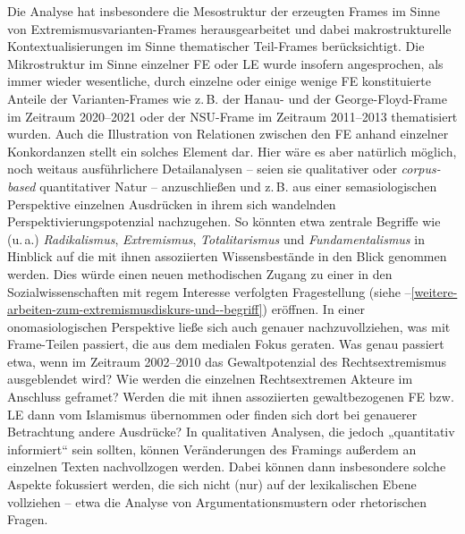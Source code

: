 Die Analyse hat insbesondere die Mesostruktur der erzeugten Frames im Sinne von Extremismusvarianten-Frames herausgearbeitet und dabei makrostrukturelle Kontextualisierungen im Sinne thematischer Teil-Frames berücksichtigt. Die Mikrostruktur im Sinne einzelner FE oder LE wurde insofern angesprochen, als immer wieder wesentliche, durch einzelne oder einige wenige FE konstituierte Anteile der Varianten-Frames wie z.\,B. der Hanau- und der George-Floyd-Frame im Zeitraum 2020--2021 oder der NSU-Frame im Zeitraum 2011--2013 thematisiert wurden. Auch die Illustration von Relationen zwischen den FE anhand einzelner Konkordanzen stellt ein solches Element dar. Hier wäre es aber natürlich möglich, noch weitaus ausführlichere Detailanalysen -- seien sie qualitativer oder \emph{corpus-based} quantitativer Natur -- anzuschließen und z.\,B. aus einer semasiologischen Perspektive einzelnen Ausdrücken in ihrem sich wandelnden Perspektivierungspotenzial nachzugehen. So könnten etwa zentrale Begriffe wie (u.\,a.) \emph{Radikalismus}, \emph{Extremismus}, \emph{Totalitarismus} und \emph{Fundamentalismus} in Hinblick auf die mit ihnen assoziierten Wissensbestände in den Blick genommen werden. Dies würde einen neuen methodischen Zugang zu einer in den Sozialwissenschaften mit regem Interesse verfolgten Fragestellung (siehe –\ref{weitere-arbeiten-zum-extremismusdiskurs-und--begriff}) eröffnen. In einer onomasiologischen Perspektive ließe sich auch genauer nachzuvollziehen, was mit Frame-Teilen passiert, die aus dem medialen Fokus geraten. Was genau passiert etwa, wenn im Zeitraum 2002--2010 das Gewaltpotenzial des Rechtsextremismus ausgeblendet wird? Wie werden die einzelnen Rechtsextremen Akteure im Anschluss geframet? Werden die mit ihnen assoziierten gewaltbezogenen FE bzw. LE dann vom Islamismus übernommen oder finden sich dort bei genauerer Betrachtung andere Ausdrücke? In qualitativen Analysen, die jedoch „quantitativ informiert`` \autocite{bubenhoferQuantitativInformierteQualitative2013} sein sollten, können Veränderungen des Framings außerdem an einzelnen Texten nachvollzogen werden. Dabei können dann insbesondere solche Aspekte fokussiert werden, die sich nicht (nur) auf der lexikalischen Ebene vollziehen -- etwa die Analyse von Argumentationsmustern oder rhetorischen Fragen.

